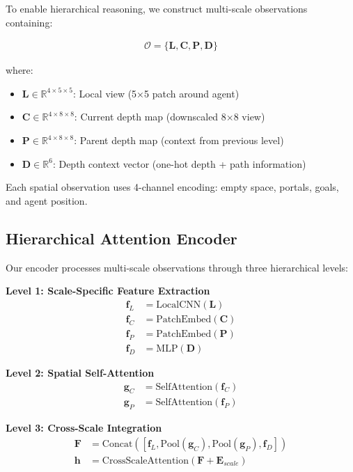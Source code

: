 \documentclass[11pt]{article}
\begin{document}
To enable hierarchical reasoning, we construct multi-scale observations containing:

\begin{align}
\mathcal{O} = \{\mathbf{L}, \mathbf{C}, \mathbf{P}, \mathbf{D}\}
\end{align}

where:
\begin{itemize}
    \item $\mathbf{L} \in \mathbb{R}^{4 \times 5 \times 5}$: Local view (5×5 patch around agent)
    \item $\mathbf{C} \in \mathbb{R}^{4 \times 8 \times 8}$: Current depth map (downscaled 8×8 view)
    \item $\mathbf{P} \in \mathbb{R}^{4 \times 8 \times 8}$: Parent depth map (context from previous level)
    \item $\mathbf{D} \in \mathbb{R}^{6}$: Depth context vector (one-hot depth + path information)
\end{itemize}

Each spatial observation uses 4-channel encoding: empty space, portals, goals, and agent position.

\subsection{Hierarchical Attention Encoder}

Our encoder processes multi-scale observations through three hierarchical levels:

\textbf{Level 1: Scale-Specific Feature Extraction}
\begin{align}
\mathbf{f}_L &= \text{LocalCNN}(\mathbf{L}) \\
\mathbf{f}_C &= \text{PatchEmbed}(\mathbf{C}) \\
\mathbf{f}_P &= \text{PatchEmbed}(\mathbf{P}) \\
\mathbf{f}_D &= \text{MLP}(\mathbf{D})
\end{align}

\textbf{Level 2: Spatial Self-Attention}
\begin{align}
\mathbf{g}_C &= \text{SelfAttention}(\mathbf{f}_C) \\
\mathbf{g}_P &= \text{SelfAttention}(\mathbf{f}_P)
\end{align}

\textbf{Level 3: Cross-Scale Integration}
\begin{align}
\mathbf{F} &= \text{Concat}([\mathbf{f}_L, \text{Pool}(\mathbf{g}_C), \text{Pool}(\mathbf{g}_P), \mathbf{f}_D]) \\
\mathbf{h} &= \text{CrossScaleAttention}(\mathbf{F} + \mathbf{E}_{scale})
\end{align}
\end{document}
